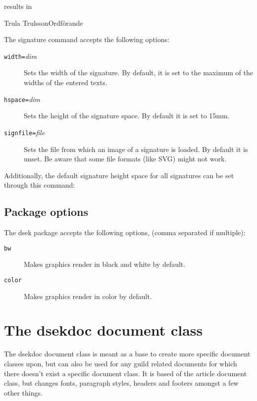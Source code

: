 \documentclass[a4paper, oneside]{ltxdoc}
\begin{document}
results in

\begin{center}
  \signature{Lund, dag som ovan}{Trula Trulsson}{Ordförande}
\end{center}

The signature command accepts the following options:
\begin{description}
  \item[\texttt{width=}\textlangle\textit{dim}\textrangle] Sets the width of the
    signature.  By default, it is set to the maximum of the widths of the
    entered texts.
  \item[\texttt{hspace=}\textlangle\textit{dim}\textrangle] Sets the height of
    the signature space.  By default it is set to 15mm.
  \item[\texttt{signfile=}\textlangle\textit{file}\textrangle] Sets the file
    from which an image of a signature is loaded. By default it is unset.  Be
    aware that some file formats (like SVG) might not work.
\end{description}

Additionally, the default signature height space for all signatures can be set
through this command:
\begin{center}
\end{center}

\subsection{Package options}
The \textsf{dsek} package accepts the following options, (comma separated if
multiple):

\begin{description}
  \item[\texttt{bw}] Makes graphics render in black and white by default.
  \item[\texttt{color}] Makes graphics render in color by default.
\end{description}

\section{The \textsf{dsekdoc} document class}
The \textsf{dsekdoc} document class is meant as a base to create more specific
document classes upon, but can also be used for any guild related documents for
which there doesn't exist a specific document class.  It is based of the
\textsf{article} document class, but changes fonts, paragraph styles, headers
and footers amongst a few other things.
\end{document}

